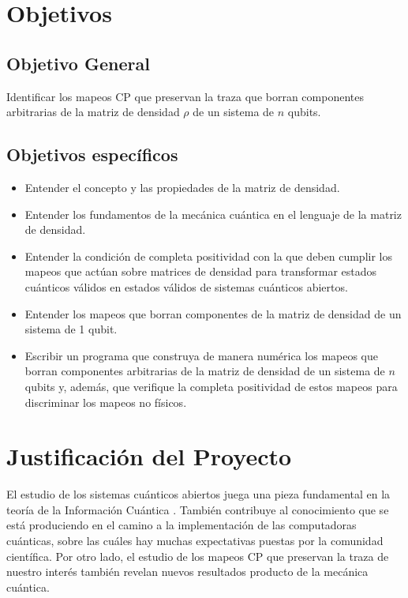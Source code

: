 \documentclass[11pt, spanish, letterpage]{article} %
\begin{document}
\section{Objetivos} %
\subsection{Objetivo General}
Identificar los mapeos CP  que preservan la traza que borran
componentes arbitrarias de la matriz de densidad $\rho$ de un sistema de $n$
qubits. 	

\subsection{Objetivos específicos}
\begin{itemize}
\item Entender el concepto y las propiedades de la matriz de densidad.
\item Entender los fundamentos de la mecánica cuántica en el lenguaje de la
	  matriz de densidad.
\item Entender la condición de completa positividad con la que deben cumplir 
	  los mapeos que actúan sobre matrices de densidad para transformar estados
      cuánticos válidos en estados válidos de sistemas cuánticos abiertos.
\item Entender los mapeos que borran componentes de la matriz de densidad
	  de un sistema de 1 qubit.
\item Escribir un programa que construya de manera numérica los mapeos que
	  borran componentes arbitrarias de la matriz de densidad de un sistema 
	  de $n$ qubits y, además, que verifique la completa positividad de estos
	  mapeos para discriminar los mapeos no físicos. 
\end{itemize}

\section{Justificación del Proyecto}%
El estudio de los sistemas cuánticos abiertos juega  una pieza fundamental en la teoría de la
Información Cuántica . También contribuye al conocimiento que se
está produciendo en el camino a la implementación de las computadoras
cuánticas, sobre las cuáles hay muchas expectativas puestas por la comunidad
científica. Por otro lado, el estudio de los mapeos CP que preservan la traza
de nuestro interés también revelan nuevos resultados producto de la mecánica
cuántica.   
\end{document}
